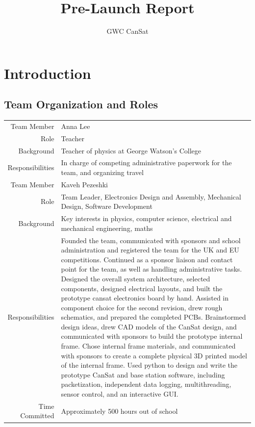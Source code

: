 \documentclass[]{report}
\title{Pre-Launch Report}
\author{GWC CanSat}
\begin{document}
\maketitle

\tableofcontents
\listoffigures
\chapter{Introduction}
\section{Team Organization and Roles}

\begin{center}
	\begin{longtable}{rp{13cm}}		
		Team Member&Anna Lee \\
		Role&Teacher \\
		Background&Teacher of physics at George Watson's College \\
		Responsibilities&In charge of competing administrative paperwork for the team, and organizing travel\\
		\hline
		Team Member&Kaveh Pezeshki \\
		Role&Team Leader, Electronics Design and Assembly, Mechanical Design, Software Development \\
		Background&Key interests in physics, computer science, electrical and mechanical engineering, maths \\
		Responsibilities&Founded the team, communicated with sponsors and school administration and registered the team for the UK and EU competitions. Continued as a sponsor liaison and contact point for the team, as well as handling administrative tasks. Designed the overall system architecture, selected components, designed electrical layouts, and built the prototype cansat electronics board by hand. Assisted in component choice for the second revision, drew rough schematics, and prepared the completed PCBs. Brainstormed design ideas, drew CAD models of the CanSat design, and communicated with sponsors to build the prototype internal frame. Chose internal frame materials, and communicated with sponsors to create a complete physical 3D printed model of the internal frame. Used python to design and write the prototype CanSat and base station software, including packetization, independent data logging, multithreading, sensor control, and an interactive GUI.
		\\
		Time Committed&Approximately 500 hours out of school\\

\end{longtable}
\end{center}
\end{document}
